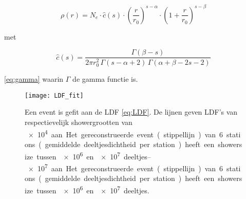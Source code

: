 \begin{equation}
\rho(r) = N_e \cdot \hat{c}(s) \cdot \left(\frac{r}{r_0}\right)^{s-\alpha} \cdot \left(1 + \frac{r}{r_0}\right)^{s-\beta}
\label{eq:LDF}
\end{equation}

met

\begin{equation}
\hat{c}(s) = \frac{\Gamma(\beta-s)}{2\pi r_0^2 \, \Gamma(s-\alpha+2) \, \Gamma(\alpha+\beta-2s-2)}
\label{eq:gamma}
\end{equation}

\eqref{eq:gamma} waarin $\Gamma$ de gamma functie is.

\begin{figure}
    \centering
    \texttt{[image: LDF\_fit]}
    \caption{Een event is gefit aan de LDF \eqref{eq:LDF}. De lijnen geven
    LDF’s van respectievelijk showergrootten van \SIrange{e4}{e7} aan. Het
    gereconstrueerde event (stippellijn) van 6 stations (gemiddelde deeltjesdichtheid
    per station) heeft een showersize tussen \SI{e6} en \SI{e7} deeltjes.}
    \label{fig:LDF_fit}
\end{figure} 


